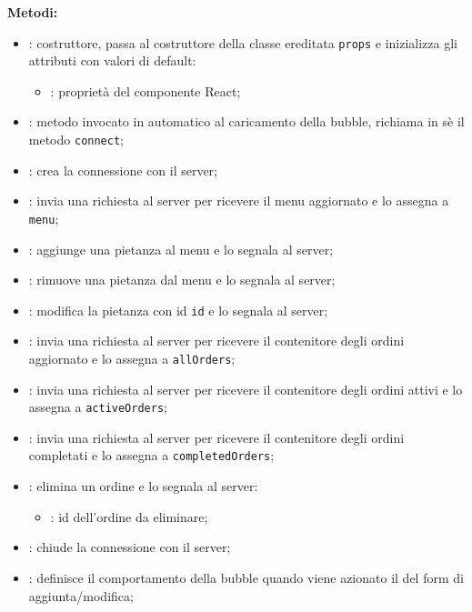 \textbf{Metodi:}
\begin{itemize}
	\item {}: costruttore, passa al costruttore della classe ereditata \texttt{props} e inizializza gli attributi con valori di default:
	\begin{itemize}
		\item {}: proprietà del componente React;
	\end{itemize}
	\item {}: metodo invocato in automatico al caricamento della bubble, richiama in sè il metodo \texttt{connect};
	\item {}: crea la connessione con il server;
	\item {}: invia una richiesta al server per ricevere il menu aggiornato e lo assegna a \texttt{menu};
	\item {}: aggiunge una pietanza al menu e lo segnala al server;
	\item {}: rimuove una pietanza dal menu e lo segnala al server;
	\item {}: modifica la pietanza con id \texttt{id} e lo segnala al server;
	\item {}: invia una richiesta al server per ricevere il contenitore degli ordini aggiornato e lo assegna a \texttt{allOrders};
	\item {}: invia una richiesta al server per ricevere il contenitore degli ordini attivi e lo assegna a \texttt{activeOrders};
	\item {}: invia una richiesta al server per ricevere il contenitore degli ordini completati e lo assegna a \texttt{completedOrders};
	\item {}: elimina un ordine e lo segnala al server:
	\begin{itemize}
		\item {}: id dell'ordine da eliminare;
	\end{itemize}
	\item {}: chiude la connessione con il server;
	\item {}: definisce il comportamento della bubble quando viene azionato il  del form di aggiunta/modifica;

\end{itemize}
